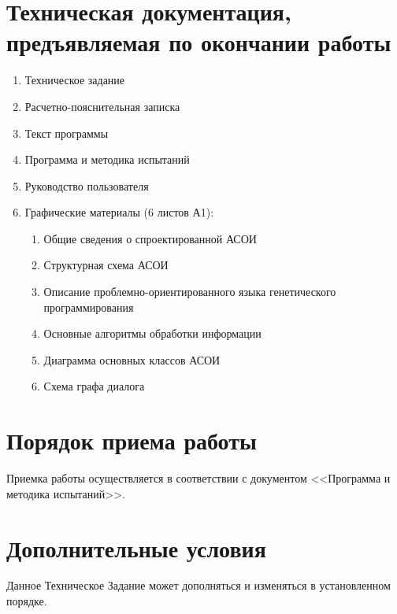 \documentclass[russian,utf8,emptystyle]{eskdtext}
\begin{document}
\section{Техническая документация, предъявляемая по окончании работы}
\begin{enumerate}
\item Техническое задание
\item Расчетно-пояснительная записка
\item Текст программы
\item Программа и методика испытаний
\item Руководство пользователя
\item Графические материалы (6 листов А1):
\begin{enumerate}
\item Общие сведения о спроектированной АСОИ
\item Структурная схема АСОИ
\item Описание проблемно-ориентированного языка генетического программирования
\item Основные алгоритмы обработки информации
\item Диаграмма основных классов АСОИ
\item Схема графа диалога
\end{enumerate}
\end{enumerate}

\section{Порядок приема работы}
Приемка работы осуществляется в соответствии с документом <<Программа и методика испытаний>>.

\section{Дополнительные условия}
Данное Техническое Задание может дополняться и изменяться в установленном порядке.
\end{document}
